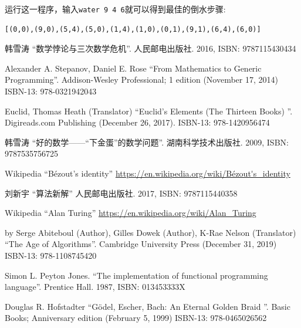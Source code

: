 \documentclass{article}
\begin{document}
运行这一程序，输入\texttt{water 9 4 6}就可以得到最佳的倒水步骤:

\begin{verbatim}
[(0,0),(9,0),(5,4),(5,0),(1,4),(1,0),(0,1),(9,1),(6,4),(6,0)]
\end{verbatim}

\ifx\wholebook\relax \else
\begin{thebibliography}{99}

{\fontspec{\cnmainft}韩雪涛 ``数学悖论与三次数学危机''. 人民邮电出版社. 2016, ISBN: 9787115430434}

Alexander A. Stepanov, Daniel E. Rose ``From Mathematics to Generic Programming''. Addison-Wesley Professional; 1 edition (November 17, 2014) ISBN-13: 978-0321942043

Euclid, Thomas Heath (Translator) ``Euclid's Elements (The Thirteen Books) ''. Digireads.com Publishing (December 26, 2017). ISBN-13: 978-1420956474

{\fontspec{\cnmainft}韩雪涛 ``好的数学——“下金蛋”的数学问题''. 湖南科学技术出版社. 2009, ISBN: 9787535756725}

Wikipedia ``Bézout's identity'' \url{https://en.wikipedia.org/wiki/Bézout's_identity}

{\fontspec{\cnmainft}刘新宇 ``算法新解'' 人民邮电出版社. 2017, ISBN: 9787115440358}

Wikipedia ``Alan Turing'' \url{https://en.wikipedia.org/wiki/Alan_Turing}

by Serge Abiteboul (Author), Gilles Dowek (Author), K-Rae Nelson (Translator) ``The Age of Algorithms''. Cambridge University Press (December 31, 2019) ISBN-13: 978-1108745420

Simon L. Peyton Jones. ``The implementation of functional programming language''. Prentice Hall. 1987, ISBN: 013453333X

Douglas R. Hofstadter ``Gödel, Escher, Bach: An Eternal Golden Braid ''. Basic Books; Anniversary edition (February 5, 1999) ISBN-13: 978-0465026562

\end{thebibliography}

\expandafter\enddocument

\fi
\end{document}

